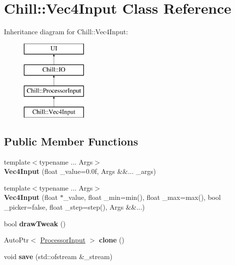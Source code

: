 \hypertarget{class_chill_1_1_vec4_input}{}\section{Chill\+:\+:Vec4\+Input Class Reference}
\label{class_chill_1_1_vec4_input}
Inheritance diagram for Chill\+:\+:Vec4\+Input\+:\begin{figure}[H]
\begin{center}
\leavevmode
\includegraphics[height=4.000000cm]{class_chill_1_1_vec4_input}
\end{center}
\end{figure}
\subsection*{Public Member Functions}
\begin{DoxyCompactItemize}
\item 
\mbox{\label{class_chill_1_1_vec4_input_a4742a9ad94a06707c683b0117a591ced}} 
{\footnotesize template$<$typename ... Args$>$ }\\{\bfseries Vec4\+Input} (float \+\_\+value=0.\+0f, Args \&\&... \+\_\+args)
\item 
\mbox{\label{class_chill_1_1_vec4_input_a1367befcccd20b51bb383f912156269d}} 
{\footnotesize template$<$typename ... Args$>$ }\\{\bfseries Vec4\+Input} (float $\ast$\+\_\+value, float \+\_\+min=min(), float \+\_\+max=max(), bool \+\_\+picker=false, float \+\_\+step=step(), Args \&\&...)
\item 
\mbox{\label{class_chill_1_1_vec4_input_a7b4a7489d7bd2a275a5b04ddd9c9d399}} 
bool {\bfseries draw\+Tweak} ()
\item 
\mbox{\label{class_chill_1_1_vec4_input_a5afbe983425e75d3859ea933c4d5fb1c}} 
Auto\+Ptr$<$ \mbox{\hyperlink{class_chill_1_1_processor_input}{Processor\+Input}} $>$ {\bfseries clone} ()
\item 
\mbox{\label{class_chill_1_1_vec4_input_a35eb6775dd8794995129153ca8eda12b}} 
void {\bfseries save} (std\+::ofstream \&\+\_\+stream)
\end{DoxyCompactItemize}
